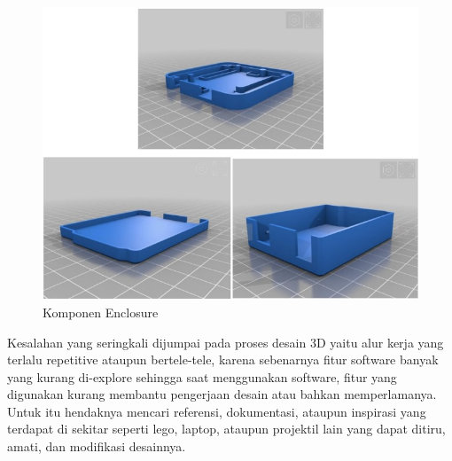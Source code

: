 \begin{figure}[H]
    \centering
    \includegraphics[width=1\linewidth]{P3/img/image2.jpg}
    \caption{Komponen Enclosure}
    \label{fig:Komponen Enclosure}
\end{figure}

Kesalahan yang seringkali dijumpai pada proses desain 3D yaitu alur kerja yang terlalu repetitive ataupun
bertele-tele, karena sebenarnya fitur software banyak yang kurang di-explore sehingga saat
menggunakan software, fitur yang digunakan kurang membantu pengerjaan desain atau bahkan
memperlamanya. Untuk itu hendaknya mencari referensi, dokumentasi, ataupun inspirasi yang terdapat
di sekitar seperti lego, laptop, ataupun projektil lain yang dapat ditiru, amati, dan modifikasi desainnya.

